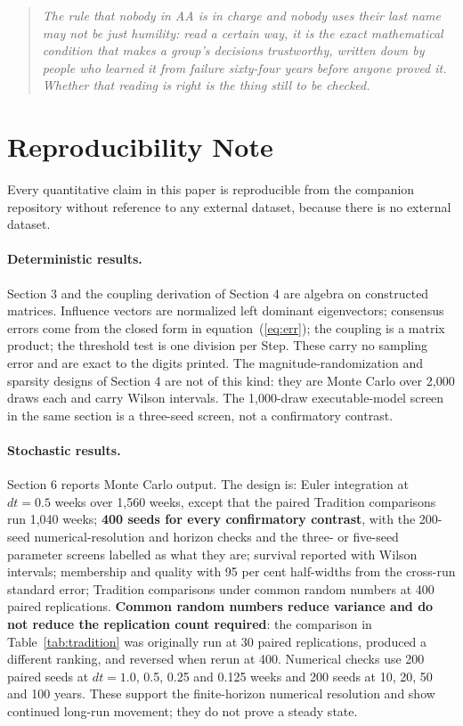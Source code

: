 \documentclass[11pt,a4paper]{article}
\begin{document}
\begin{quote}\itshape
The rule that nobody in AA is in charge and nobody uses their last name may not be
just humility: read a certain way, it is the exact mathematical condition that
makes a group's decisions trustworthy, written down by people who learned it from
failure sixty-four years before anyone proved it. Whether that reading is right is
the thing still to be checked.
\end{quote}

\section{Reproducibility Note}

Every quantitative claim in this paper is reproducible from the companion
repository without reference to any external dataset, because there is no external
dataset.

\paragraph{Deterministic results.} Section 3 and the coupling derivation of Section 4
are algebra on constructed matrices. Influence vectors are normalized left dominant eigenvectors; consensus
errors come from the closed form in equation~(\ref{eq:err}); the coupling is a
matrix product; the threshold test is one division per Step. These carry no
sampling error and are exact to the digits printed. The magnitude-randomization and
sparsity designs of Section 4 are not of this kind: they are Monte Carlo over 2,000
draws each and carry Wilson intervals. The 1,000-draw executable-model screen in the same
section is a three-seed screen, not a confirmatory contrast.

\paragraph{Stochastic results.} Section 6 reports Monte Carlo output. The design
is: Euler integration at $dt = 0.5$ weeks over 1,560 weeks, except that the paired
Tradition comparisons run 1,040 weeks;
\textbf{400 seeds for every confirmatory contrast}, with the 200-seed numerical-resolution
and horizon checks and the three- or five-seed parameter screens labelled as what they
are; survival reported with Wilson
intervals; membership and quality with 95 per cent half-widths from the cross-run
standard error; Tradition comparisons under common random numbers at 400 paired
replications. \textbf{Common random numbers reduce variance and do not reduce the
replication count required}: the comparison in Table~\ref{tab:tradition} was
originally run at 30 paired replications, produced a different ranking, and
reversed when rerun at 400.
Numerical checks use 200 paired seeds at $dt=1.0$, 0.5, 0.25 and 0.125 weeks and
200 seeds at 10, 20, 50 and 100 years. These support the finite-horizon numerical
resolution and show continued long-run movement; they do not prove a steady state.
\end{document}
